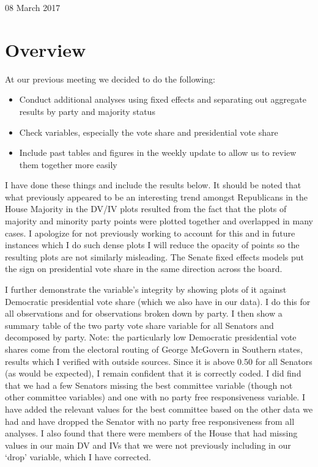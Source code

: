 \documentclass[12pt]{article}
\begin{document}
	
\begin{center}
	\Large 08 March 2017
\end{center}

\section{Overview}

At our previous meeting we decided to do the following:

\begin{itemize}
	\item Conduct additional analyses using fixed effects and separating out aggregate results by party and majority status
	
	\item Check variables, especially the vote share and presidential vote share
	
	\item Include past tables and figures in the weekly update to allow us to review them together more easily
\end{itemize}


I have done these things and include the results below. It should be noted that what previously appeared to be an interesting trend amongst Republicans in the House Majority in the DV/IV plots resulted from the fact that the plots of majority and minority party points were plotted together and overlapped in many cases. I apologize for not previously working to account for this and in future instances which I do such dense plots I will reduce the opacity of points so the resulting plots are not similarly misleading. The Senate fixed effects models put the sign on presidential vote share in the same direction across the board. 

I further demonstrate the variable's integrity by showing plots of it against Democratic presidential vote share (which we also have in our data). I do this for all observations and for observations broken down by party. I then show a summary table of the two party vote share variable for all Senators and decomposed by party. Note: the particularly low Democratic presidential vote shares come from the electoral routing of George McGovern in Southern states, results which I verified with outside sources. Since it is above 0.50 for all Senators (as would be expected), I remain confident that it is correctly coded. I did find that we had a few Senators missing the best committee variable (though not other committee variables) and one with no party free responsiveness variable. I have added the relevant values for the best committee based on the other data we had and have dropped the Senator with no party free responsiveness from all analyses. I also found that there were members of the House that had missing values in our main DV and IVs that we were not previously including in our `drop' variable, which I have corrected.
\end{document}
